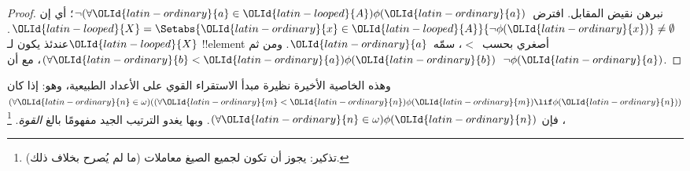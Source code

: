 \documentclass[../../../include/open-logic-section]{subfiles}
\begin{document}
\begin{proof}
نبرهن نقيض المقابل. افترض~$\lnot(\forall {\OLId{latin-ordinary}{a}} \in {\OLId{latin-looped}{A}})\phi({\OLId{latin-ordinary}{a}})$؛ أي إن
${\OLId{latin-looped}{X}} = \Setabs{{\OLId{latin-ordinary}{x}} \in {\OLId{latin-looped}{A}}}{\lnot\phi({\OLId{latin-ordinary}{x}})} \neq \emptyset$. عندئذ يكون
لـ${\OLId{latin-looped}{X}}$ !!{element} أصغري بحسب~$<$، سمّه~${\OLId{latin-ordinary}{a}}$. ومن ثم
$(\forall {\OLId{latin-ordinary}{b}} < {\OLId{latin-ordinary}{a}})\phi({\OLId{latin-ordinary}{b}})$، مع أن~$\lnot \phi({\OLId{latin-ordinary}{a}})$.
\end{proof}\noindent
وهذه الخاصية الأخيرة نظيرة مبدأ الاستقراء القوي على الأعداد الطبيعية،
وهو: إذا كان
$(\forall {\OLId{latin-ordinary}{n}} \in \omega)((\forall {\OLId{latin-ordinary}{m}} < {\OLId{latin-ordinary}{n}})\phi({\OLId{latin-ordinary}{m}}) \lif \phi({\OLId{latin-ordinary}{n}}))$، فإن
$(\forall {\OLId{latin-ordinary}{n}} \in \omega)\phi({\OLId{latin-ordinary}{n}})$. وبها يغدو الترتيب الجيد مفهومًا بالغ
\emph{القوة}.
\footnote{تذكير: يجوز أن تكون لجميع الصيغ معاملات (ما لم يُصرح بخلاف ذلك).}
\end{document}
